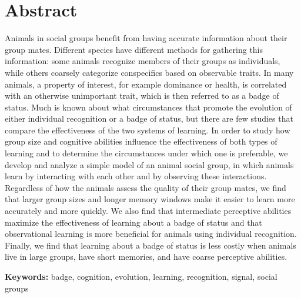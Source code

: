 \section*{Abstract}
Animals in social groups benefit from having accurate information about their group mates. Different species have different methods for gathering this information: some animals recognize members of their groups as individuals, while others coarsely categorize conspecifics based on observable traits. In many animals, a property of interest, for example dominance or health, is correlated with an otherwise unimportant trait, which is then referred to as a badge of status. Much is known about what circumstances that promote the evolution of either individual recognition or a badge of status, but there are few studies that compare the effectiveness of the two systems of learning. In order to study how group size and cognitive abilities influence the effectiveness of both types of learning and to determine the circumstances under which one is preferable, we develop and analyze a simple model of an animal social group, in which animals learn by interacting with each other and by observing these interactions. Regardless of how the animals assess the quality of their group mates, we find that larger group sizes and longer memory windows make it easier to learn more accurately and more quickly. We also find that intermediate perceptive abilities maximize the effectiveness of learning about a badge of status and that observational learning is more beneficial for animals using individual recognition. Finally, we find that learning about a badge of status is less costly when animals live in large groups, have short memories, and have coarse perceptive abilities.



\textbf{Keywords:} badge, cognition, evolution, learning, recognition, signal, social groups

\newpage
